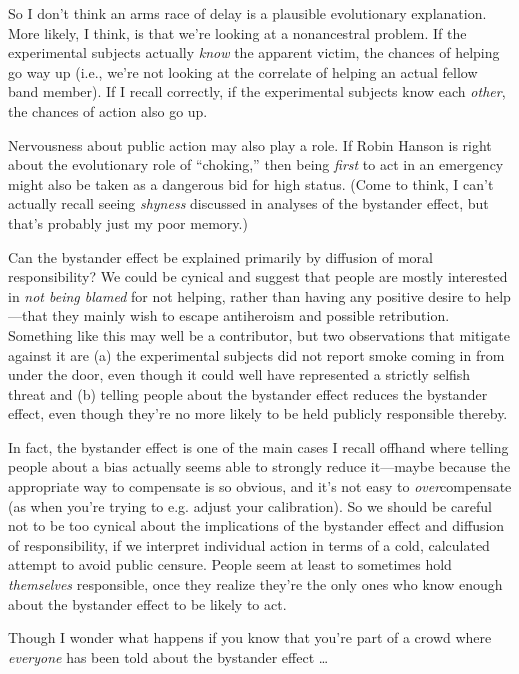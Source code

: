 {
 So I don't think an arms race of delay is a
plausible evolutionary explanation. More likely, I think, is that
we're looking at a nonancestral problem. If the
experimental subjects actually \textit{know} the apparent victim, the
chances of helping go way up (i.e., we're not looking
at the correlate of helping an actual fellow band member). If I recall
correctly, if the experimental subjects know each \textit{other}, the
chances of action also go up.}

{
 Nervousness about public action may also play a role. If Robin
Hanson is right about the evolutionary role of
``choking,'' then being
\textit{first} to act in an emergency might also be taken as a
dangerous bid for high status. (Come to think, I can't
actually recall seeing \textit{shyness} discussed in analyses of the
bystander effect, but that's probably just my poor
memory.)}

{
 Can the bystander effect be explained primarily by diffusion of
moral responsibility? We could be cynical and suggest that people are
mostly interested in \textit{not being blamed} for not helping, rather
than having any positive desire to help---that they mainly wish to
escape antiheroism and possible retribution. Something like this may
well be a contributor, but two observations that mitigate against it
are (a) the experimental subjects did not report smoke coming in from
under the door, even though it could well have represented a strictly
selfish threat and (b) telling people about the bystander effect
reduces the bystander effect, even though they're no
more likely to be held publicly responsible thereby.}

{
 In fact, the bystander effect is one of the main cases I recall
offhand where telling people about a bias actually seems able to
strongly reduce it---maybe because the appropriate way to compensate is
so obvious, and it's not easy to
\textit{over}compensate (as when you're trying to e.g.
adjust your calibration). So we should be careful not to be too cynical
about the implications of the bystander effect and diffusion of
responsibility, if we interpret individual action in terms of a cold,
calculated attempt to avoid public censure. People seem at least to
sometimes hold \textit{themselves} responsible, once they realize
they're the only ones who know enough about the
bystander effect to be likely to act.}

{
 Though I wonder what happens if you know that
you're part of a crowd where \textit{everyone} has been
told about the bystander effect \ldots}

